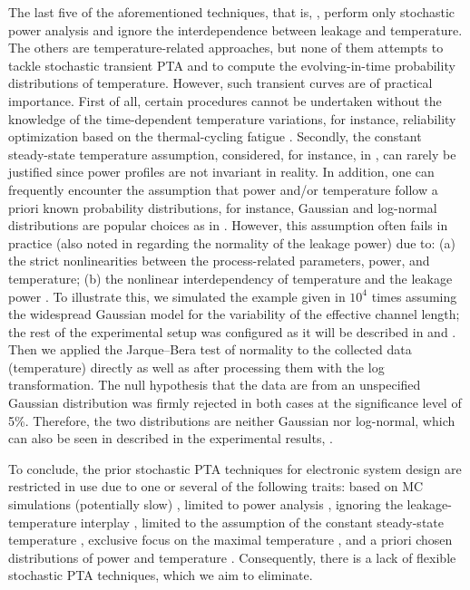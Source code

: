 The last five of the aforementioned techniques, that is, \cite{shen2009,
bhardwaj2006, bhardwaj2008, vrudhula2006, ghanta2006}, perform only stochastic
power analysis and ignore the interdependence between leakage and temperature.
The others are temperature-related approaches, but none of them attempts to
tackle stochastic transient PTA and to compute the evolving-in-time probability
distributions of temperature. However, such transient curves are of practical
importance. First of all, certain procedures cannot be undertaken without the
knowledge of the time-dependent temperature variations, for instance,
reliability optimization based on the thermal-cycling fatigue \cite{ukhov2012}.
Secondly, the constant steady-state temperature assumption, considered, for
instance, in \cite{juan2011, juan2012, huang2009a, lee2013}, can rarely be
justified since power profiles are not invariant in reality. In addition, one
can frequently encounter the assumption that power and/or temperature follow a
priori known probability distributions, for instance, Gaussian and log-normal
distributions are popular choices as in \cite{srivastava2010, juan2012,
bhardwaj2006}. However, this assumption often fails in practice (also noted in
\cite{juan2012} regarding the normality of the leakage power) due to: (a) the
strict nonlinearities between the process-related parameters, power, and
temperature; (b) the nonlinear interdependency of temperature and the leakage
power \cite{liu2007}. To illustrate this, we simulated the example given in
 $10^4$ times assuming the widespread Gaussian model for the
variability of the effective channel length; the rest of the experimental setup
was configured as it will be described in  and
. Then we applied the Jarque--Bera test of normality
to the collected data (temperature) directly as well as after processing them
with the log transformation. The null hypothesis that the data are from an
unspecified Gaussian distribution was firmly rejected in both cases at the
significance level of 5\%. Therefore, the two distributions are neither Gaussian
nor log-normal, which can also be seen in 
described in the experimental results, .

To conclude, the prior stochastic PTA techniques for electronic system design
are restricted in use due to one or several of the following traits: based on MC
simulations (potentially slow) \cite{chandra2010}, limited to power analysis
\cite{chandra2010, shen2009, bhardwaj2006, bhardwaj2008, vrudhula2006,
ghanta2006}, ignoring the leakage-temperature interplay \cite{huang2009a,
shen2009, bhardwaj2006, bhardwaj2008, vrudhula2006, ghanta2006}, limited to the
assumption of the constant steady-state temperature \cite{juan2011, juan2012,
huang2009a, lee2013}, exclusive focus on the maximal temperature
\cite{juan2011}, and a priori chosen distributions of power and temperature
\cite{srivastava2010, juan2012, bhardwaj2006}. Consequently, there is a lack of
flexible stochastic PTA techniques, which we aim to eliminate.

